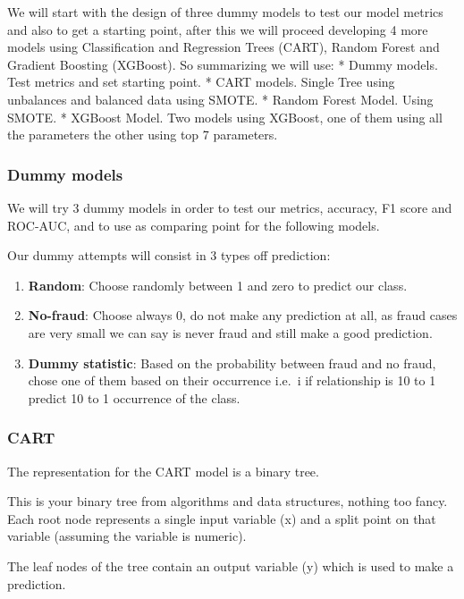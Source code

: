 \documentclass[
]{article}
\providecommand{\tightlist}{%
  \setlength{\itemsep}{0pt}\setlength{\parskip}{0pt}}
\begin{document}
We will start with the design of three dummy models to test our model
metrics and also to get a starting point, after this we will proceed
developing 4 more models using Classification and Regression Trees
(CART), Random Forest and Gradient Boosting (XGBoost). So summarizing we
will use: * Dummy models. Test metrics and set starting point. * CART
models. Single Tree using unbalances and balanced data using SMOTE. *
Random Forest Model. Using SMOTE. * XGBoost Model. Two models using
XGBoost, one of them using all the parameters the other using top 7
parameters.

\hypertarget{dummy-models}{%
\subsubsection{Dummy models}\label{dummy-models}}

We will try 3 dummy models in order to test our metrics, accuracy, F1
score and ROC-AUC, and to use as comparing point for the following
models.

Our dummy attempts will consist in 3 types off prediction:

\begin{enumerate}
\def\labelenumi{\arabic{enumi}.}
\tightlist
\item
  \textbf{Random}: Choose randomly between 1 and zero to predict our
  class.
\item
  \textbf{No-fraud}: Choose always 0, do not make any prediction at all,
  as fraud cases are very small we can say is never fraud and still make
  a good prediction.
\item
  \textbf{Dummy statistic}: Based on the probability between fraud and
  no fraud, chose one of them based on their occurrence i.e.~i if
  relationship is 10 to 1 predict 10 to 1 occurrence of the class.
\end{enumerate}

\hypertarget{cart}{%
\subsubsection{CART}\label{cart}}

The representation for the CART model is a binary tree.

This is your binary tree from algorithms and data structures, nothing
too fancy. Each root node represents a single input variable (x) and a
split point on that variable (assuming the variable is numeric).

The leaf nodes of the tree contain an output variable (y) which is used
to make a prediction.
\end{document}
